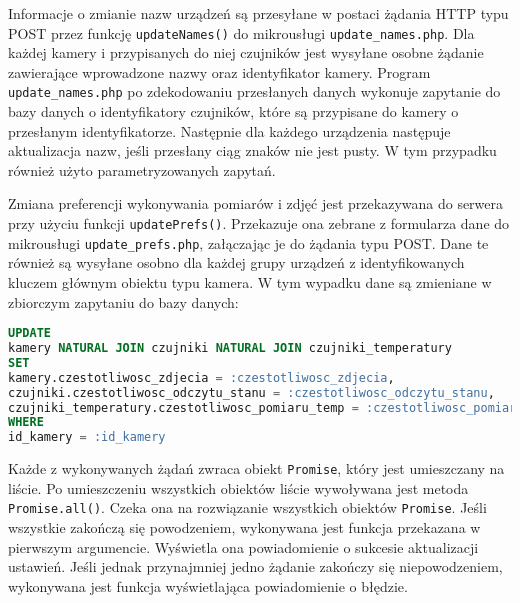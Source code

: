\documentclass[a4paper,11pt,twoside]{article}
\begin{document}
Informacje o zmianie nazw urządzeń są przesyłane w postaci żądania HTTP typu POST przez funkcję \texttt{updateNames()} do mikrousługi \texttt{update{\_}names.php}. Dla każdej kamery i przypisanych do niej czujników jest wysyłane osobne żądanie zawierające wprowadzone nazwy oraz identyfikator kamery. Program \texttt{update{\_}names.php} po zdekodowaniu przesłanych danych wykonuje zapytanie do bazy danych o identyfikatory czujników, które są przypisane do kamery o przesłanym identyfikatorze. Następnie dla każdego urządzenia następuje aktualizacja nazw, jeśli przesłany ciąg znaków nie jest pusty. W tym przypadku również użyto parametryzowanych zapytań.

Zmiana preferencji wykonywania pomiarów i zdjęć jest przekazywana do serwera przy użyciu funkcji \texttt{updatePrefs()}. Przekazuje ona zebrane z formularza dane do mikrousługi \texttt{update{\_}prefs.php}, załączając je do żądania typu POST. Dane te również są wysyłane osobno dla każdej grupy urządzeń z identyfikowanych kluczem głównym obiektu typu kamera. W tym wypadku dane są zmieniane w zbiorczym zapytaniu do bazy danych:
\begin{lstlisting}[language=SQL]
UPDATE 
kamery NATURAL JOIN czujniki NATURAL JOIN czujniki_temperatury 
SET 
kamery.czestotliwosc_zdjecia = :czestotliwosc_zdjecia, 
czujniki.czestotliwosc_odczytu_stanu = :czestotliwosc_odczytu_stanu,
czujniki_temperatury.czestotliwosc_pomiaru_temp = :czestotliwosc_pomiaru_temp
WHERE 
id_kamery = :id_kamery
\end{lstlisting}

Każde z wykonywanych żądań zwraca obiekt \texttt{Promise}, który jest umieszczany na liście. Po umieszczeniu wszystkich obiektów liście wywoływana jest metoda \texttt{Promise.all()}. Czeka ona na rozwiązanie wszystkich obiektów \texttt{Promise}. Jeśli wszystkie zakończą się powodzeniem, wykonywana jest funkcja przekazana w pierwszym argumencie. Wyświetla ona powiadomienie o sukcesie aktualizacji ustawień. Jeśli jednak przynajmniej jedno żądanie zakończy się niepowodzeniem, wykonywana jest funkcja wyświetlająca powiadomienie o błędzie.
\end{document}
